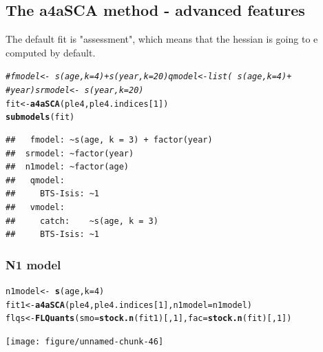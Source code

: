 \documentclass[a4paper,english,10pt]{article}\usepackage[]{graphicx}\usepackage[]{color}
\makeatletter
\newcommand{\hlnum}[1]{\textcolor[rgb]{0.686,0.059,0.569}{#1}}%
\newcommand{\hlcom}[1]{\textcolor[rgb]{0.678,0.584,0.686}{\textit{#1}}}%
\newcommand{\hlopt}[1]{\textcolor[rgb]{0,0,0}{#1}}%
\newcommand{\hlstd}[1]{\textcolor[rgb]{0.345,0.345,0.345}{#1}}%
\newcommand{\hlkwb}[1]{\textcolor[rgb]{0.69,0.353,0.396}{#1}}%
\newcommand{\hlkwc}[1]{\textcolor[rgb]{0.333,0.667,0.333}{#1}}%
\newcommand{\hlkwd}[1]{\textcolor[rgb]{0.737,0.353,0.396}{\textbf{#1}}}%
\newenvironment{kframe}{%
 \def\at@end@of@kframe{}%
 \ifinner\ifhmode%
  \def\at@end@of@kframe{\end{minipage}}%
  \begin{minipage}{\columnwidth}%
 \fi\fi%
 \def\FrameCommand##1{\hskip\@totalleftmargin \hskip-\fboxsep
 \colorbox{shadecolor}{##1}\hskip-\fboxsep
     \hskip-\linewidth \hskip-\@totalleftmargin \hskip\columnwidth}%
 \MakeFramed {\advance\hsize-\width
   \@totalleftmargin\z@ \linewidth\hsize
   \@setminipage}}%
 {\par\unskip\endMakeFramed%
 \at@end@of@kframe}
\newenvironment{knitrout}{}{} %
\makeatother
\begin{document}
\subsection{The a4aSCA method - advanced features}

The default fit is "assessment", which means that the hessian is going to e computed by default.

\begin{knitrout}
\color{fgcolor}\begin{kframe}
\begin{alltt}
\hlcom{# fmodel <- ~ s(age, k=4) + s(year, k = 20) qmodel <- list( ~ s(age, k=4) +}
\hlcom{# year) srmodel <- ~s(year, k=20)}
\hlstd{fit} \hlkwb{<-} \hlkwd{a4aSCA}\hlstd{(ple4, ple4.indices[}\hlnum{1}\hlstd{])}
\hlkwd{submodels}\hlstd{(fit)}
\end{alltt}
\begin{verbatim}
## 	 fmodel: ~s(age, k = 3) + factor(year)
## 	srmodel: ~factor(year)
## 	n1model: ~factor(age)
## 	 qmodel:
## 	   BTS-Isis: ~1
## 	 vmodel:
## 	   catch:    ~s(age, k = 3)
## 	   BTS-Isis: ~1
\end{verbatim}
\end{kframe}
\end{knitrout}


\subsubsection{N1 model}

\begin{knitrout}
\color{fgcolor}\begin{kframe}
\begin{alltt}
\hlstd{n1model} \hlkwb{<-} \hlopt{~}\hlkwd{s}\hlstd{(age,} \hlkwc{k} \hlstd{=} \hlnum{4}\hlstd{)}
\hlstd{fit1} \hlkwb{<-} \hlkwd{a4aSCA}\hlstd{(ple4, ple4.indices[}\hlnum{1}\hlstd{],} \hlkwc{n1model} \hlstd{= n1model)}
\hlstd{flqs} \hlkwb{<-} \hlkwd{FLQuants}\hlstd{(}\hlkwc{smo} \hlstd{=} \hlkwd{stock.n}\hlstd{(fit1)[,} \hlnum{1}\hlstd{],} \hlkwc{fac} \hlstd{=} \hlkwd{stock.n}\hlstd{(fit)[,} \hlnum{1}\hlstd{])}
\end{alltt}
\end{kframe}
\end{knitrout}


\begin{knitrout}
\color{fgcolor}

{\centering \texttt{[image: figure/unnamed-chunk-46]} 

}



\end{knitrout}
\end{document}
